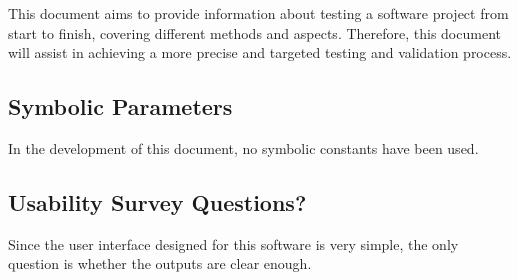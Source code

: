 \documentclass[12pt, titlepage]{article}
\begin{document}
This document aims to provide information about testing a software project from start to finish, covering different methods and aspects. Therefore, this document will assist in achieving a more precise and targeted testing and validation process.

\subsection{Symbolic Parameters}

In the development of this document, no symbolic constants have been used.
\subsection{Usability Survey Questions?}

Since the user interface designed for this software is very simple, the only question is whether the outputs are clear enough.

\newpage{}
\end{document}
